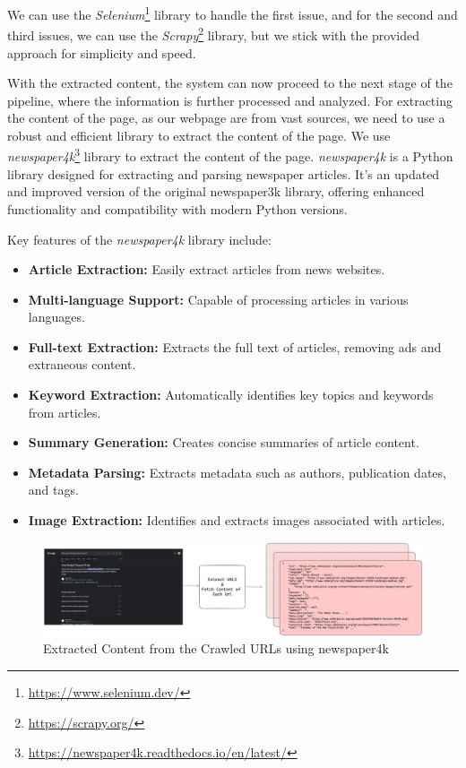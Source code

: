 We can use the \textit{Selenium}\footnote{\url{https://www.selenium.dev/}} library to handle the first issue, and for the second and third issues, we can use the \textit{Scrapy}\footnote{\url{https://scrapy.org/}} library, but we stick with the provided approach for simplicity and speed.

With the extracted content, the system can now proceed to the next stage of the pipeline, where the information is further processed and analyzed.
For extracting the content of the page, as our webpage are from vast sources, we need to use a robust and efficient library to extract the content of the page.
We use \textit{newspaper4k}\footnote{\url{https://newspaper4k.readthedocs.io/en/latest/}} library to extract the content of the page.
\textit{newspaper4k} is a Python library designed for extracting and parsing newspaper articles. It's an updated and improved version of the original newspaper3k library, offering enhanced functionality and compatibility with modern Python versions.

Key features of the \textit{newspaper4k} library include:
\begin{itemize}
    \item \textbf{Article Extraction:} Easily extract articles from news websites.
    \item \textbf{Multi-language Support:} Capable of processing articles in various languages.
    \item \textbf{Full-text Extraction:} Extracts the full text of articles, removing ads and extraneous content.
    \item \textbf{Keyword Extraction:} Automatically identifies key topics and keywords from articles.
    \item \textbf{Summary Generation:} Creates concise summaries of article content.
    \item \textbf{Metadata Parsing:} Extracts metadata such as authors, publication dates, and tags.
    \item \textbf{Image Extraction:} Identifies and extracts images associated with articles.
\end{itemize}

\begin{figure}[ht!]
    \centering
    \begin{minipage}[b]{\textwidth}
        \centering
        \includegraphics[width=\textwidth]{res/Google-Search-Result-Content}
        \caption{Extracted Content from the Crawled URLs using newspaper4k}
        \label{fig:google-search-result-content}
    \end{minipage}
\end{figure}

